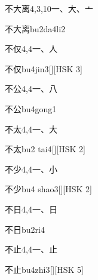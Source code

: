 \begin{entry}{不大离}{4,3,10}{⼀、⼤、⼇}
  \begin{phonetics}{不大离}{bu2da4li2}
  \end{phonetics}
\end{entry}

\begin{entry}{不仅}{4,4}{⼀、⼈}
  \begin{phonetics}{不仅}{bu4jin3}[][HSK 3]
  \end{phonetics}
\end{entry}

\begin{entry}{不公}{4,4}{⼀、⼋}
  \begin{phonetics}{不公}{bu4gong1}
  \end{phonetics}
\end{entry}

\begin{entry}{不太}{4,4}{⼀、⼤}
  \begin{phonetics}{不太}{bu2 tai4}[][HSK 2]
  \end{phonetics}
\end{entry}

\begin{entry}{不少}{4,4}{⼀、⼩}
  \begin{phonetics}{不少}{bu4 shao3}[][HSK 2]
  \end{phonetics}
\end{entry}

\begin{entry}{不日}{4,4}{⼀、⽇}
  \begin{phonetics}{不日}{bu2ri4}
  \end{phonetics}
\end{entry}

\begin{entry}{不止}{4,4}{⼀、⽌}
  \begin{phonetics}{不止}{bu4zhi3}[][HSK 5]
  \end{phonetics}
\end{entry}

